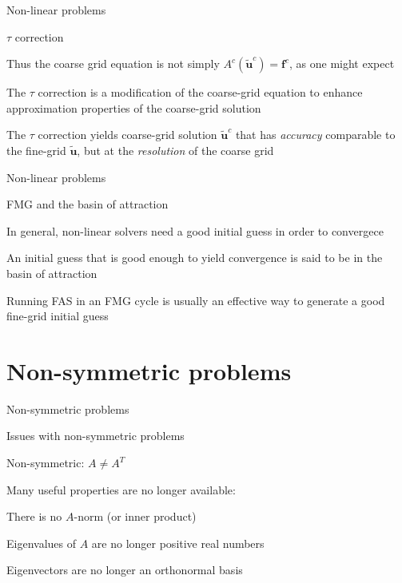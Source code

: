 \documentclass[18pt,xcolor=table]{beamer}
\begin{document}
\begin{frame}{Non-linear problems}
\begin{block}{$\tau$ correction}
\bit
\item Thus the coarse grid equation is not simply $A^c(\mathbf{\tilde{u}}^c) = \mathbf{f}^c$, as one might expect
\item The $\tau$ correction is a modification of the coarse-grid equation to enhance approximation properties of the coarse-grid solution
\item The $\tau$ correction yields coarse-grid solution $\mathbf{\tilde{u}}^c$ that has \emph{accuracy} comparable to the fine-grid $\mathbf{\tilde{u}}$, but at the \emph{resolution} of the coarse grid
\eit
\end{block}
\end{frame}

\begin{frame}{Non-linear problems}
\begin{block}{FMG and the basin of attraction}
\bit
\item In general, non-linear solvers need a good initial guess in order to convergece
\item An initial guess that is good enough to yield convergence is said to be in the basin of attraction
\item Running FAS in an FMG cycle is usually an effective way to generate a good fine-grid initial guess
\eit
\end{block}
\end{frame}


\section{Non-symmetric problems}

\begin{frame}{Non-symmetric problems}
\begin{block}{Issues with non-symmetric problems}
\bit
\item Non-symmetric: $A\neq A^T$
\item Many useful properties are no longer available:
\bit
\item There is no $A$-norm (or inner product)
\item Eigenvalues of $A$ are no longer positive real numbers
\item Eigenvectors are no longer an orthonormal basis
\eit
\eit
\end{block}
\end{frame}
\end{document}

